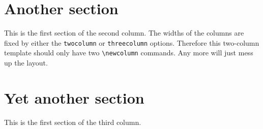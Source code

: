 \documentclass[final]{beamer}
\begin{document}
\begin{poster}
\newcolumn

\section{Another section}
This is the first section of the second column. The widths of the columns are fixed by either the \texttt{twocolumn} or \texttt{threecolumn} options. Therefore this two-column template should only have two \verb+\newcolumn+ commands. Any more will just mess up the layout. 



\newcolumn



\section{Yet another section}
This is the first section of the third column.



\end{poster}
\end{document}
